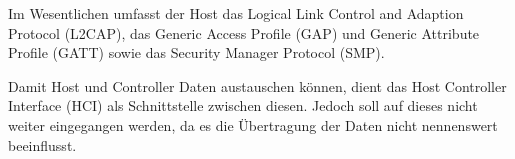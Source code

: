 Im Wesentlichen umfasst der Host das Logical Link Control and Adaption Protocol (L2CAP), das Generic Access Profile (GAP) und Generic Attribute Profile (GATT) sowie das Security Manager Protocol (SMP).

Damit Host und Controller Daten austauschen können, dient das Host Controller Interface (HCI) als Schnittstelle zwischen diesen. Jedoch soll auf dieses nicht weiter eingegangen werden, da es die Übertragung der Daten nicht nennenswert beeinflusst. %